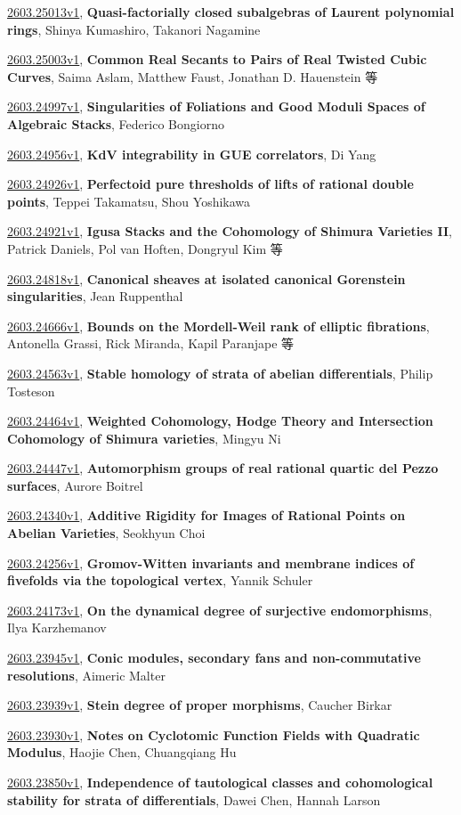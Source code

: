 \documentclass[9pt, a4paper]{article}
\theoremstyle{plain}
\theoremstyle{definition}
\theoremstyle{remark}
\newcommand{\arxiv}[3]{\href{https://arxiv.org/abs/#1}{#1}, \textbf{\textcolor{arxivblue}{#2}}, #3}
\begin{document}
\arxiv{2603.25013v1}{Quasi-factorially closed subalgebras of Laurent polynomial rings}{Shinya Kumashiro, Takanori Nagamine}

\arxiv{2603.25003v1}{Common Real Secants to Pairs of Real Twisted Cubic Curves}{Saima Aslam, Matthew Faust, Jonathan D. Hauenstein 等}

\arxiv{2603.24997v1}{Singularities of Foliations and Good Moduli Spaces of Algebraic Stacks}{Federico Bongiorno}

\arxiv{2603.24956v1}{KdV integrability in GUE correlators}{Di Yang}

\arxiv{2603.24926v1}{Perfectoid pure thresholds of lifts of rational double points}{Teppei Takamatsu, Shou Yoshikawa}

\arxiv{2603.24921v1}{Igusa Stacks and the Cohomology of Shimura Varieties II}{Patrick Daniels, Pol van Hoften, Dongryul Kim 等}

\arxiv{2603.24818v1}{Canonical sheaves at isolated canonical Gorenstein singularities}{Jean Ruppenthal}

\arxiv{2603.24666v1}{Bounds on the Mordell-Weil rank of elliptic fibrations}{Antonella Grassi, Rick Miranda, Kapil Paranjape 等}

\arxiv{2603.24563v1}{Stable homology of strata of abelian differentials}{Philip Tosteson}

\arxiv{2603.24464v1}{Weighted Cohomology, Hodge Theory and Intersection Cohomology of Shimura varieties}{Mingyu Ni}

\arxiv{2603.24447v1}{Automorphism groups of real rational quartic del Pezzo surfaces}{Aurore Boitrel}

\arxiv{2603.24340v1}{Additive Rigidity for Images of Rational Points on Abelian Varieties}{Seokhyun Choi}

\arxiv{2603.24256v1}{Gromov-Witten invariants and membrane indices of fivefolds via the topological vertex}{Yannik Schuler}

\arxiv{2603.24173v1}{On the dynamical degree of surjective endomorphisms}{Ilya Karzhemanov}

\arxiv{2603.23945v1}{Conic modules, secondary fans and non-commutative resolutions}{Aimeric Malter}

\arxiv{2603.23939v1}{Stein degree of proper morphisms}{Caucher Birkar}

\arxiv{2603.23930v1}{Notes on Cyclotomic Function Fields with Quadratic Modulus}{Haojie Chen, Chuangqiang Hu}

\arxiv{2603.23850v1}{Independence of tautological classes and cohomological stability for strata of differentials}{Dawei Chen, Hannah Larson}
\end{document}
